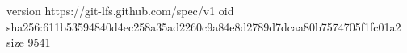 version https://git-lfs.github.com/spec/v1
oid sha256:611b53594840d4ec258a35ad2260c9a84e8d2789d7dcaa80b7574705f1fc01a2
size 9541
